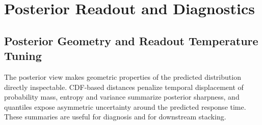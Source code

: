 \documentclass[12pt]{article}
\begin{document}
\begin{table}[!t]
\centering
\caption{Five-seed robustness summary for selected core models. Values are mean $\pm$ sample standard deviation over seeds 2025--2029; R11 range is min--max across seeds. Posterior scores are reported only for event-time segmentation runs.}
\label{tab:seed_robustness}
\scriptsize
\setlength{\tabcolsep}{3pt}
\renewcommand{\arraystretch}{1.12}
\end{table}

\section{Posterior Readout and Diagnostics}
\label{sec:posterior_diagnostics}

\subsection{Posterior Geometry and Readout Temperature Tuning}

The posterior view makes geometric properties of the predicted distribution directly inspectable. CDF-based distances penalize temporal displacement of probability mass, entropy and variance summarize posterior sharpness, and quantiles expose asymmetric uncertainty around the predicted response time. These summaries are useful for diagnosis and for downstream stacking.
\end{document}

